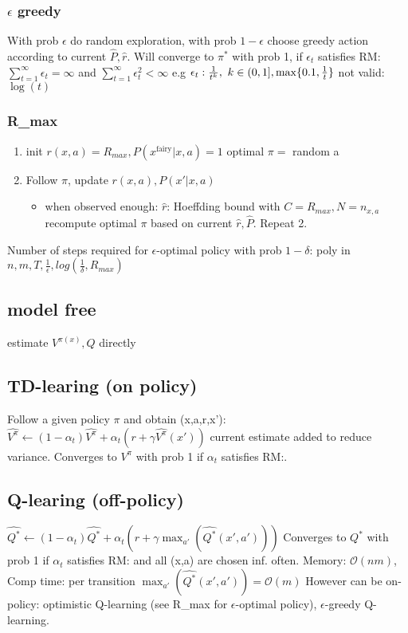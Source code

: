 \subsubsection{$\epsilon$ greedy}
With prob $\epsilon$ do random exploration, with prob $1-\epsilon$ choose greedy action according to current
$\hat{P}, \hat{r}$.
Will converge to $\pi^{*}$ with prob 1, if $\epsilon_{t}$ satisfies \color{magenta}RM:\color{black}
$\sum_{t=1}^{\infty}\epsilon_{t} = \infty$ and $\sum_{t=1}^{\infty}\epsilon_{t}^{2} < \infty$
e.g $\epsilon_{t}:\frac{1}{t^{k}},\ k \in (0,1],\max\cset{0.1,\frac{1}{t}}$ not valid: $\log(t)$


\subsubsection{R_{max}}
\begin{enumerate}
    \item init $r(x,a) = R_{max}, P(x^{\text{fairy}}|x,a)=1$ \textrightarrow optimal $\pi=$ random a
    \item Follow $\pi$, update $r(x,a), P(x'|x,a)$
    \begin{itemize}
        \item when observed enough: $\hat{r}$: Hoeffding bound with $C=R_{max}, N=n_{x,a}$\\
        recompute optimal $\pi$ based on current $\hat{r}, \hat{P}$. Repeat 2.
    \end{itemize}
\end{enumerate}
Number of steps required for $\epsilon$-optimal policy with prob $1-\delta$:
poly in $n,m,T,\frac{1}{\epsilon}, log(\frac{1}{\delta}, R_{max})$


\subsection{model free}
estimate $V^{\pi(x)}, Q$ directly

\subsection{TD-learing (on policy)}
Follow a given policy $\pi$ and obtain (x,a,r,x'):
$\hat{V^\pi} \leftarrow (1-\alpha_{t})\hat{V^\pi} + \alpha_t (r + \gamma \hat{V^\pi}(x'))$
current estimate added to reduce variance.
Converges to $V^\pi$ with prob 1 if $\alpha_{t}$ satisfies \color{magenta}RM:\color{black}.

\subsection{Q-learing (off-policy)}
$\hat{Q^*} \leftarrow (1-\alpha_{t})\hat{Q^*} + \alpha_t (r + \gamma \max_{a'}(\hat{Q^*}(x',a')))$
Converges to $Q^*$ with prob 1 if $\alpha_{t}$ satisfies \color{magenta}RM:\color{black} and
all (x,a) are chosen inf. often.
Memory: $\mathcal{O}(nm)$, Comp time: per transition $\max_{a'}(\hat{Q^*}(x',a')) = \mathcal{O}(m)$
However can be on-policy:
optimistic Q-learning (see R_max for $\epsilon$-optimal policy), $\epsilon$-greedy Q-learning.


